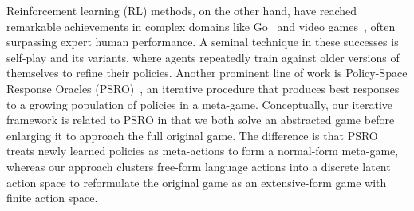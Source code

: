 Reinforcement learning (RL) methods, on the other hand, have reached remarkable achievements in complex domains like Go~\cite{silver2016mastering,silver2018general} and video games~\cite{vinyals2019grandmaster,berner2019dota}, often surpassing expert human performance. A seminal technique in these successes is self-play and its variants\citep{heinrich2015fictitious,heinrich2016deep,hennes2020neural,xu2023fictitious}, where agents repeatedly train against older versions of themselves to refine their policies. Another prominent line of work is Policy-Space Response Oracles (PSRO)~\citep{lanctot2017unified,muller2019generalized}, an iterative procedure that produces best responses to a growing population of policies in a meta-game. Conceptually, our iterative framework is related to PSRO in that we both solve an abstracted game before enlarging it to approach the full original game. The difference is that PSRO treats newly learned policies as meta-actions to form a normal-form meta-game, whereas our approach clusters free-form language actions into a discrete latent action space to reformulate the original game as an extensive-form game with finite action space.

